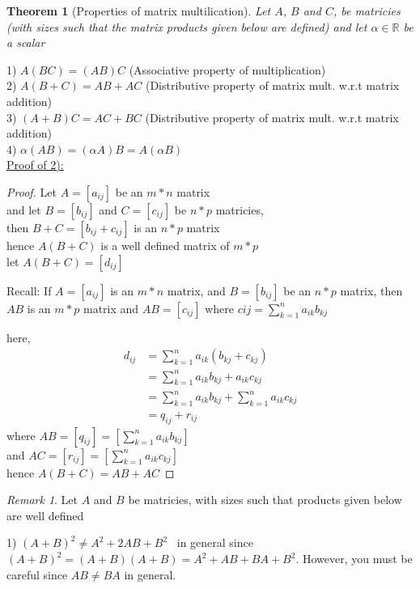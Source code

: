 \documentclass{jhwhw}
\newtheorem{theorem}{Theorem}
\theoremstyle{definition}
\theoremstyle{remark}
\newtheorem*{remark}{Remark}
\theoremstyle{example}
\begin{document}
\begin{theorem}[Properties of matrix multilication] Let \(A\), \(B\) and \(C\), be matricies (with sizes such that the matrix products given below are defined) and let \(\alpha \in \mathbb{R}\)  be a scalar\end{theorem}

1) \(A(BC) = (AB)C\) (Associative property of multiplication)\\
2) \(A(B+C) = AB+AC\) (Distributive property of matrix mult. w.r.t matrix addition)\\ 
3) \((A+B)C = AC + BC\) (Distributive property of matrix mult. w.r.t matrix addition)\\
4) \(\alpha (AB) = (\alpha A)B = A(\alpha B)\)
\\

\underline{Proof of 2):}
\\
\begin{proof} 
Let \(A=[a_{ij}]\) be an \(m*n\) matrix\\ and let \(B = [b_{ij}]\) and  \(C = [c_{ij}]\) be \(n*p\) matricies, \\
then \(B+C = [b_{ij} + c_{ij}]\) is an \(n*p\) matrix\\
hence \(A(B+C)\) is a well defined matrix of \(m*p\)\\
let \(A(B+C) = [d_{ij}]\)

Recall: If \(A = [a_{ij}]\) is an \(m*n\) matrix, and \(B = [b_{ij}]\) be an \(n*p\) matrix, then \(AB\) is an \(m*p\) matrix and \(AB = [c_{ij}]\) where \(cij = \sum_{k=1}^{n} a_{ik} b_{kj}\)

here, \begin{align*} 
d_{ij} &= \sum_{k=1}^{n} a_{ik}(b_{kj}+c_{kj})\\
&= \sum_{k=1}^{n} a_{ik} b_{kj} + a_{ik} c_{kj}\\
&= \sum_{k=1}^{n} a_{ik} b_{kj} + \sum_{k=1}^{n} a_{ik} c_{kj}\\
&= q_{ij} + r_{ij}
\end{align*}
where \(AB=[q_{ij}] = [\sum_{k=1}^{n} a_{ik} b_{kj}]\)\\
and \(AC=[r_{ij}] = [\sum_{k=1}^{n} a_{ik} c_{kj}]\)\\
hence \(A(B+C)= AB + AC\)
\end{proof}

\begin{remark} Let \(A\) and \(B\) be matricies, with sizes such that products given below are well defined \end{remark}
1) \((A+B)^2 \neq A^2 + 2AB + B^2 \) \(\,\) in general since \((A+B)^2 = (A+B)(A+B) = A^2 +AB + BA + B^2\). However, you must be careful since \(AB \neq BA\) in general.
\end{document}
